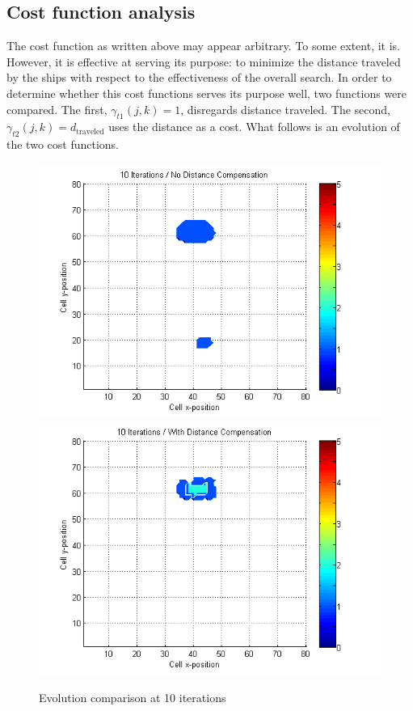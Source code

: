 \documentclass[a4paper]{article}
\begin{document}
\subsection{Cost function analysis}

The cost function as written above may appear arbitrary. To some extent, it is. However, it is effective at serving its purpose: to minimize the distance traveled by the ships with respect to the effectiveness of the overall search. In order to determine whether this cost functions serves its purpose well, two functions were compared. The first, $\gamma_{t1}(j,k)=1$, disregards distance traveled. The second, $\gamma_{t2}(j,k)=d_{\mbox{traveled}}$ uses the distance as a cost. What follows is an evolution of the two cost functions.

\begin{figure}[H]\begin{center}
\includegraphics[scale=0.45]{../Matlab/Images/SearchCountNoDist010.png}
\includegraphics[scale=0.45]{../Matlab/Images/SearchCountDist010.png}
\caption{Evolution comparison at 10 iterations}
\end{center}\end{figure}
\end{document}
